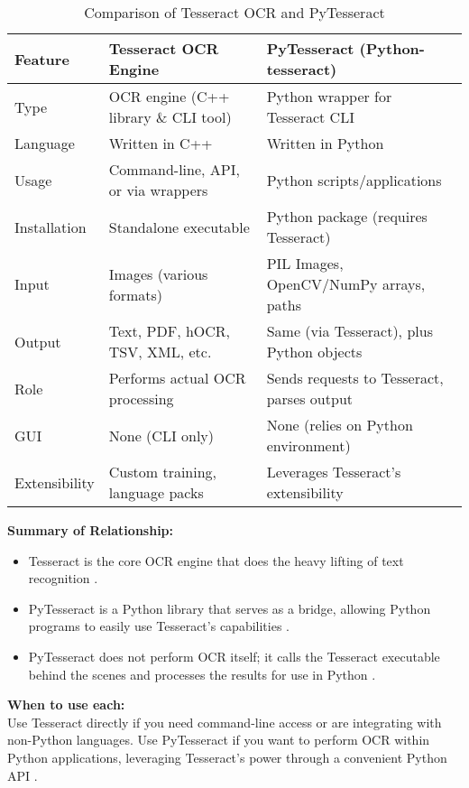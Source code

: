 \begin{table}[htbp]
	\centering
	\begin{tabular}{|l|l|l|}
		\hline
		\textbf{Feature} & \textbf{Tesseract OCR Engine} & \textbf{PyTesseract (Python-tesseract)} \\
		\hline
		Type & OCR engine (C++ library \& CLI tool) & Python wrapper for Tesseract CLI \\
		\hline
		Language & Written in C++ & Written in Python \\
		\hline
		Usage & Command-line, API, or via wrappers & Python scripts/applications \\
		\hline
		Installation & Standalone executable & Python package (requires Tesseract) \\
		\hline
		Input & Images (various formats) & PIL Images, OpenCV/NumPy arrays, paths \\
		\hline
		Output & Text, PDF, hOCR, TSV, XML, etc. & Same (via Tesseract), plus Python objects \\
		\hline
		Role & Performs actual OCR processing & Sends requests to Tesseract, parses output \\
		\hline
		GUI & None (CLI only) & None (relies on Python environment) \\
		\hline
		Extensibility & Custom training, language packs & Leverages Tesseract's extensibility \\
		\hline
	\end{tabular}
	\caption{Comparison of Tesseract OCR and PyTesseract}
\end{table}

\textbf{Summary of Relationship:}
\begin{itemize}
	\item Tesseract is the core OCR engine that does the heavy lifting of text recognition \cite {Betterpath:2023, Restack:2025}.
	\item PyTesseract is a Python library that serves as a bridge, allowing Python programs to easily use Tesseract's capabilities \cite {Nutrient:2025, DataCamp:2024}.
	\item PyTesseract does not perform OCR itself; it calls the Tesseract executable behind the scenes and processes the results for use in Python \cite {GeekyAnts:2023}.
\end{itemize}

\textbf{When to use each:}\\
Use Tesseract directly if you need command-line access or are integrating with non-Python languages. Use PyTesseract if you want to perform OCR within Python applications, leveraging Tesseract's power through a convenient Python API \cite {DataCamp:2024, Nutrient:2025}.

